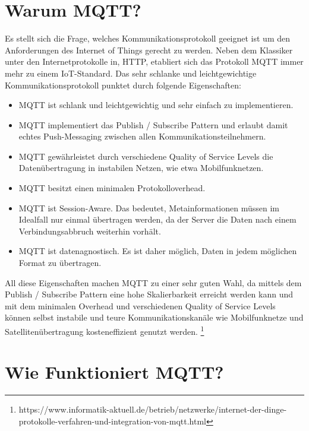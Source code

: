 \section{Warum MQTT?}
Es stellt sich die Frage, welches Kommunikationsprotokoll geeignet ist um den Anforderungen des Internet of Things gerecht zu werden. Neben dem Klassiker unter den Internetprotokolle in, HTTP, etabliert sich das Protokoll MQTT immer mehr zu einem IoT-Standard. Das sehr schlanke und leichtgewichtige Kommunikationsprotokoll punktet durch folgende Eigenschaften:

\begin{itemize}
\item MQTT ist schlank und leichtgewichtig und sehr einfach zu implementieren.
\item MQTT implementiert das Publish / Subscribe Pattern und erlaubt damit echtes Push-Messaging zwischen allen Kommunikationsteilnehmern.
\item MQTT gewährleistet durch verschiedene Quality of Service Levels die Datenübertragung in instabilen Netzen, wie etwa Mobilfunknetzen.
\item MQTT besitzt einen minimalen Protokolloverhead.
\item MQTT ist Session-Aware. Das bedeutet, Metainformationen müssen im Idealfall nur einmal übertragen werden, da der Server die Daten nach einem Verbindungsabbruch weiterhin vorhält.
\item MQTT ist datenagnostisch. Es ist daher möglich, Daten in jedem möglichen Format zu übertragen.
\end{itemize}


All diese Eigenschaften machen MQTT zu einer sehr guten Wahl, da mittels dem Publish / Subscribe Pattern eine hohe Skalierbarkeit erreicht werden kann und mit dem minimalen Overhead und verschiedenen Quality of Service Levels können selbst instabile und teure Kommunikationskanäle wie Mobilfunknetze und Satellitenübertragung kosteneffizient genutzt werden.
\footnote{https://www.informatik-aktuell.de/betrieb/netzwerke/internet-der-dinge-protokolle-verfahren-und-integration-von-mqtt.html}

\pagebreak
\section{Wie Funktioniert MQTT?}

